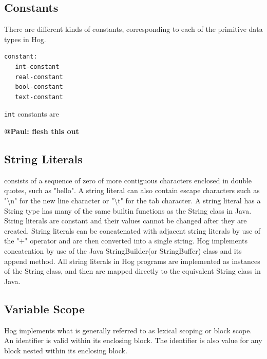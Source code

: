 \documentclass{article}
\begin{document}
\subsection{Constants} %
\label{sub:constants}

There are different kinds of constants, corresponding to each of the primitive data types in Hog.

\begin{verbatim}
constant:
   int-constant
   real-constant
   bool-constant
   text-constant  
\end{verbatim}

{\tt int} constants are 

\textbf{@Paul: flesh this out}


\subsection{String Literals} %
consists of a sequence of zero of more contiguous characters enclosed in double
quotes, such as "hello". A string literal can also contain escape characters such
as "\textbackslash n" for the new line character or "\textbackslash t" for the tab
character. A string literal has a String type has many of the same builtin
functions as the String class in Java. String literals are constant and their
values cannot be changed after they are created. String literals can be
concatenated with adjacent string literals by use of the "+" operator and are then
converted into a single string. Hog implements concatention by use of the Java
StringBuilder(or StringBuffer) class and its append method. All string literals in
Hog programs are implemented as instances of the String class, and then are mapped
directly to the equivalent String class in Java.


\subsection{Variable Scope} %
\label{sub:variable_scope}

Hog implements what is generally referred to as lexical scoping or block scope. An
identifier is valid within its enclosing block. The identifier is also value for
any block nested within its enclosing block.

\end{document}
